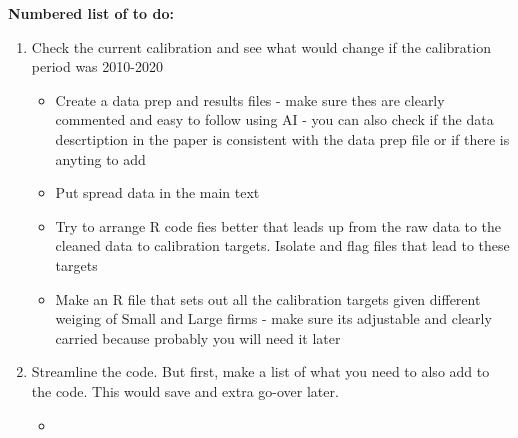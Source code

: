 \documentclass[12pt]{article}
\begin{document}
\newpage

\noindent \textbf{Numbered list of to do:}
 \begin{enumerate}
    \item Check the current calibration and see what would change if the calibration period was 2010-2020
     \begin{itemize}
        \item Create a data prep and results files - make sure thes are clearly commented and easy to follow using AI - you can also check if the data descrtiption in the paper is consistent with the data prep file or if there is anyting to add 
        \item Put spread data in the main text
        \item Try to arrange R code fies better that leads up from the raw data to the cleaned data to calibration targets. Isolate and flag files that lead to these targets
        \item Make an R file that sets out all the calibration targets given different weiging of Small and Large firms - make sure its adjustable and clearly carried because probably you will need it later
     \end{itemize}
    \item Streamline the code. But first, make a list of what you need to also add to the code. This would save and extra go-over later. 
     \begin{itemize}
        \item 
     \end{itemize}
\end{enumerate}
\end{document}
